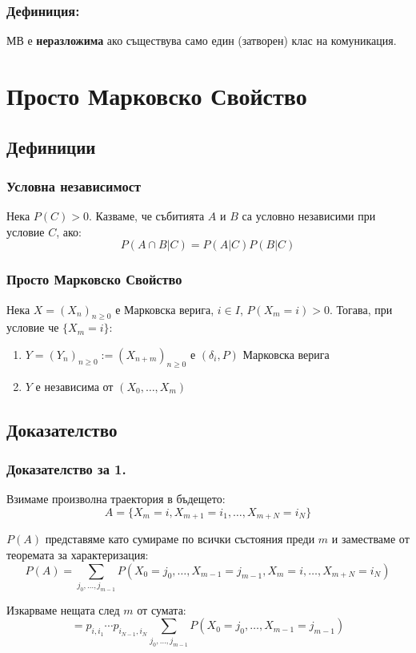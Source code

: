 \documentclass{article}
\begin{document}
\subsubsection*{Дефиниция:}
МВ е \textbf{неразложима} ако съществува само един (затворен) клас на комуникация.

\section{Просто Марковско Свойство}
\subsection{Дефиниции}
\subsubsection*{Условна независимост}
Нека $P(C) > 0$. Казваме, че събитията $A$ и $B$ са условно независими при условие $C$, ако:
$$P(A \cap B | C) = P(A | C)P(B | C)$$

\subsubsection*{Просто Марковско Свойство}
Нека $X = (X_n)_{n\geq0}$ е Марковска верига, $i \in I$, $P(X_m = i) > 0$. Тогава, при условие че $\{X_m = i\}$:
\begin{enumerate}
\item $Y = (Y_n)_{n\geq0} := (X_{n+m})_{n\geq0}$ е $(\delta_i, P)$ Марковска верига
\item $Y$ е независима от $(X_0, \dots, X_m)$
\end{enumerate}

\subsection{Доказателство}
\subsubsection*{Доказателство за 1.}
Взимаме произволна траектория в бъдещето:
$$A = \{X_m = i, X_{m+1} = i_1, \dots, X_{m+N} = i_N\}$$

$P(A)$ представяме като сумираме по всички състояния преди $m$ и заместваме от теоремата за характеризация:
$$P(A) = \sum_{j_0,\dots,j_{m-1}} P(X_0 = j_0, \dots, X_{m-1} = j_{m-1}, X_m = i, \dots, X_{m+N} = i_N)$$

Изкарваме нещата след $m$ от сумата:
$$= p_{i,i_1}\cdots p_{i_{N-1},i_N} \sum_{j_0,\dots,j_{m-1}} P(X_0 = j_0, \dots, X_{m-1} = j_{m-1})$$
\end{document}
